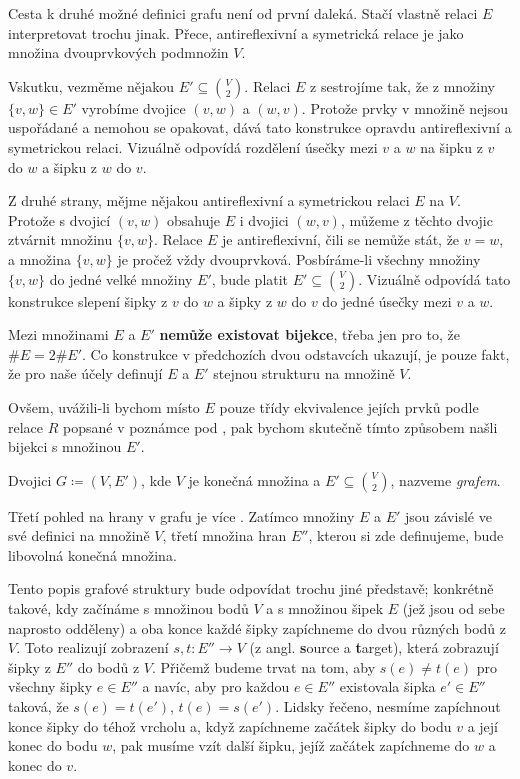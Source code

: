 Cesta k druhé možné definici grafu není od první daleká. Stačí vlastně relaci
$E$ interpretovat trochu jinak. Přece, antireflexivní a symetrická relace je
 jako množina dvouprvkových podmnožin $V$.

Vskutku, vezměme nějakou $E' \subseteq \binom{V}{2}$. Relaci $E$ z
 sestrojíme tak, že z množiny $\{v,w\} \in E'$
vyrobíme dvojice $(v,w)$ a $(w,v)$. Protože prvky v množině nejsou uspořádané a
nemohou se opakovat, dává tato konstrukce opravdu antireflexivní a symetrickou
relaci. Vizuálně odpovídá rozdělení úsečky mezi $v$ a $w$ na šipku z $v$ do $w$
a šipku z $w$ do $v$.

Z druhé strany, mějme nějakou antireflexivní a symetrickou relaci $E$ na $V$.
Protože s dvojicí $(v,w)$ obsahuje $E$ i dvojici $(w,v)$, můžeme z těchto dvojic
ztvárnit množinu $\{v,w\}$. Relace $E$ je antireflexivní, čili se nemůže stát,
že $v = w$, a množina $\{v,w\}$ je pročež vždy dvouprvková. Posbíráme-li všechny
množiny $\{v,w\}$ do jedné velké množiny $E'$, bude platit $E' \subseteq
\binom{V}{2}$. Vizuálně odpovídá tato konstrukce slepení šipky z $v$ do $w$ a
šipky z $w$ do $v$ do jedné úsečky mezi $v$ a $w$.

\begin{warning}
 Mezi množinami $E$ a $E'$ \textbf{nemůže existovat bijekce}, třeba jen pro to,
 že $\# E = 2 \# E'$. Co konstrukce v předchozích dvou odstavcích ukazují, je
 pouze fakt, že pro naše účely definují $E$ a $E'$ stejnou strukturu na množině
 $V$.

 Ovšem, uvážili-li bychom místo $E$ pouze třídy ekvivalence jejích prvků podle
 relace $R$ popsané v poznámce pod , pak bychom
 skutečně tímto způsobem našli bijekci s množinou $E'$.
\end{warning}

\begin{definition}
\label{def:graf-podruhe}
 Dvojici $G \coloneqq (V,E')$, kde $V$ je konečná množina a $E' \subseteq
 \binom{V}{2}$, nazveme \emph{grafem}.
\end{definition}

Třetí pohled na hrany v grafu je více . Zatímco množiny $E$ a
$E'$ jsou závislé ve své definici na množině $V$, třetí množina hran $E''$,
kterou si zde definujeme, bude libovolná konečná množina.

Tento popis grafové struktury bude odpovídat trochu jiné představě; konkrétně
takové, kdy začínáme s množinou bodů $V$ a s množinou šipek $E$ (jež jsou od
sebe naprosto odděleny) a oba konce každé šipky zapíchneme do dvou různých bodů
z $V$. Toto  realizují zobrazení $s,t: E'' \to V$ (z angl.
\textbf{s}ource a \textbf{t}arget), která zobrazují šipky z $E''$ do bodů z $V$.
Přičemž budeme trvat na tom, aby $s(e) \neq t(e)$ pro všechny šipky $e \in E''$
a navíc, aby pro každou $e \in E''$ existovala šipka $e' \in E''$ taková, že
$s(e) = t(e')$, $t(e) = s(e')$. Lidsky řečeno, nesmíme zapíchnout konce šipky do
téhož vrcholu a, když zapíchneme začátek šipky do bodu $v$ a její konec do bodu
$w$, pak musíme vzít další šipku, jejíž začátek zapíchneme do $w$ a konec do
$v$.

